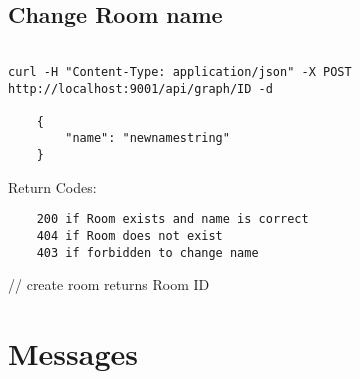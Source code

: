 \documentclass[12pt]{article}
\begin{document}
\subsection{Change Room name}

\begin{verbatim}

curl -H "Content-Type: application/json" -X POST http://localhost:9001/api/graph/ID -d 

    { 
        "name": "newnamestring" 
    }

\end{verbatim}

Return Codes:
\begin{verbatim}
    200 if Room exists and name is correct
    404 if Room does not exist
    403 if forbidden to change name
\end{verbatim}


// create room returns Room ID


\section{Messages}
\end{document}
